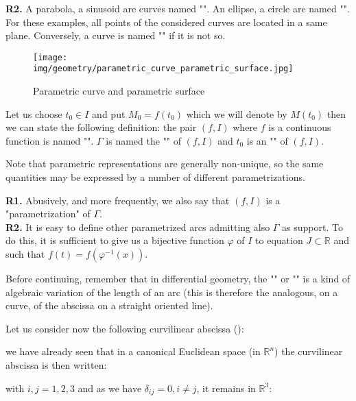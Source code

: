 {\begin{tcolorbox}[title=Remarks,colframe=black,arc=10pt]
	\textbf{R2.} A parabola, a sinusoid are curves named  "". An ellipse, a circle are named "". For these examples, all points of the considered curves are located in a same plane. Conversely, a curve is named "" if it is not so.
	\end{tcolorbox}
	\begin{figure}[H]
		\centering
		\texttt{[image: img/geometry/parametric\_curve\_parametric\_surface.jpg]}
		\caption{Parametric curve and parametric surface}
	\end{figure}
	Let us choose $t_0 \in I$ and put $M_0=f(t_0)$ which we will denote by $M(t_0)$ then we can state the following definition: the pair $(f, I)$ where $f$ is a continuous function is named "". $\Gamma$ is named the "" of $(f, I)$ and $t_0$ is an "" of $(f, I)$.
	
	Note that parametric representations are generally non-unique, so the same quantities may be expressed by a number of different parametrizations.
	\begin{tcolorbox}[title=Remarks,colframe=black,arc=10pt]
	\textbf{R1.} Abusively, and more frequently, we also say that $(f, I)$ is a "parametrization" of $\Gamma$.\\
	
	\textbf{R2.} It is easy to define other parametrized arcs admitting also $\Gamma$ as support. To do this, it is sufficient to give us a bijective function $\varphi$ of $I$ to equation $J\subset \mathbb{R}$ and such that $f(t)=f(\varphi^{-1}(x))$.
	\end{tcolorbox}
	Before continuing, remember that in differential geometry, the "" or "" is a kind of algebraic variation of the length of an arc (this is therefore the analogous, on a curve, of the abscissa on a straight oriented line).
	
	Let us consider now the following curvilinear abscissa ():
	
	we have already seen that in a canonical Euclidean space (in $\mathbb{R}^n$) the curvilinear abscissa is then written:
	
	with $i,j=1,2,3$ and as we have $\delta_{ij}=0,i\neq j$, it remains in $\mathbb{R}^3$:
	
}
